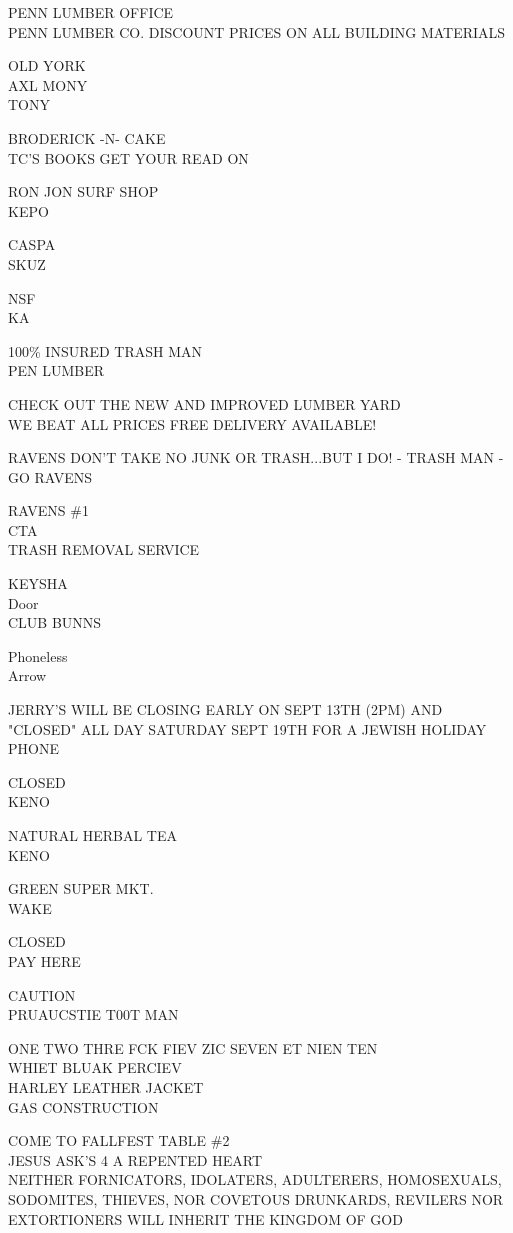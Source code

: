 \documentclass[10pt,letterpaper]{article}
\begin{document}
PENN LUMBER OFFICE\\
PENN LUMBER CO. DISCOUNT PRICES ON ALL BUILDING MATERIALS

OLD YORK\\
AXL MONY\\
TONY

BRODERICK {-}N{-} CAKE\\
TC'S BOOKS GET YOUR READ ON

RON JON SURF SHOP\\
KEPO

CASPA\\
SKUZ

NSF\\
KA

100\% INSURED TRASH MAN\\
PEN LUMBER

CHECK OUT THE NEW AND IMPROVED LUMBER YARD\\
WE BEAT ALL PRICES FREE DELIVERY AVAILABLE!

RAVENS DON'T TAKE NO JUNK OR TRASH...BUT I DO!  {-} TRASH MAN {-}\\
GO RAVENS

RAVENS \#1\\
CTA\\
TRASH REMOVAL SERVICE

KEYSHA\\
Door\\
CLUB BUNNS

Phoneless\\
Arrow

JERRY'S WILL BE CLOSING EARLY ON SEPT 13TH (2PM) AND "CLOSED" ALL DAY SATURDAY SEPT 19TH FOR A JEWISH HOLIDAY\\
PHONE

CLOSED\\
KENO

NATURAL HERBAL TEA\\
KENO

GREEN SUPER MKT.\\
WAKE

CLOSED\\
PAY HERE

CAUTION\\
PRUAUCSTIE T00T MAN

ONE TWO THRE FCK FIEV ZIC SEVEN ET NIEN TEN\\
WHIET BLUAK PERCIEV\\
HARLEY LEATHER JACKET\\
GAS CONSTRUCTION

COME TO FALLFEST TABLE \#2\\
JESUS ASK'S 4 A REPENTED HEART\\
NEITHER FORNICATORS, IDOLATERS, ADULTERERS, HOMOSEXUALS, SODOMITES, THIEVES, NOR COVETOUS DRUNKARDS, REVILERS NOR EXTORTIONERS WILL INHERIT THE KINGDOM OF GOD
\end{document}
